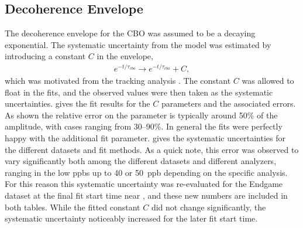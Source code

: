 \subsection{Decoherence Envelope}


The decoherence envelope for the CBO was assumed to be a decaying exponential. The systematic uncertainty from the model was estimated by introducing a constant $C$ in the envelope,
    \begin{align}
        e^{-t/\tau_{cbo}} \rightarrow e^{-t/\tau_{cbo}} + C,
    \end{align}
which was motivated from the tracking analysis \cite{phdthesis:2020Kinnaird}. The constant $C$ was allowed to float in the fits, and the observed \DR values were then taken as the systematic uncertainties.  gives the fit results for the $C$ parameters and the associated errors. As shown the relative error on the parameter is typically around 50\% of the amplitude, with cases ranging from 30--90\%. In general the fits were perfectly happy with the additional fit parameter.  gives the systematic uncertainties for the different datasets and fit methods. As a quick note, this error was observed to vary significantly both among the different datasets and different analyzers, ranging in the low ppbs up to 40 or 50~ppb depending on the specific analysis. For this reason this systematic uncertainty was re-evaluated for the Endgame dataset at the final fit start time near , and these new numbers are included in both tables. While the fitted constant $C$ did not change significantly, the systematic uncertainty noticeably increased for the later fit start time.


